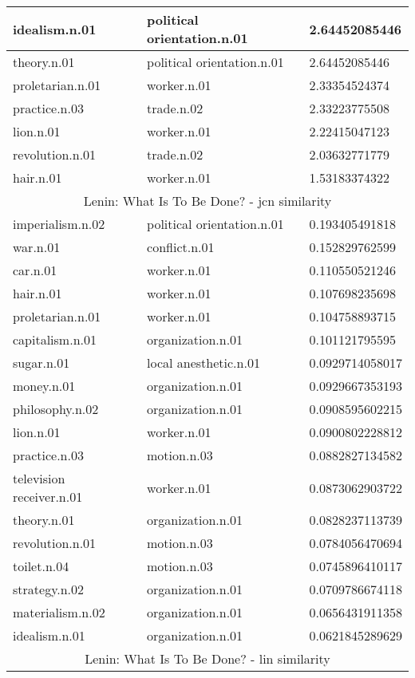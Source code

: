 \begin{center}
\begin{tabular}{ | l | l | l |}
idealism.n.01 & political orientation.n.01 & 2.64452085446 \\ \hline
theory.n.01 & political orientation.n.01 & 2.64452085446 \\ \hline
proletarian.n.01 & worker.n.01 & 2.33354524374 \\ \hline
practice.n.03 & trade.n.02 & 2.33223775508 \\ \hline
lion.n.01 & worker.n.01 & 2.22415047123 \\ \hline
revolution.n.01 & trade.n.02 & 2.03632771779 \\ \hline
hair.n.01 & worker.n.01 & 1.53183374322 \\ \hline
\multicolumn{3}{|c|}{Lenin: What Is To Be Done? - jcn similarity} \\ \hline
imperialism.n.02 & political orientation.n.01 & 0.193405491818 \\ \hline
war.n.01 & conflict.n.01 & 0.152829762599 \\ \hline
car.n.01 & worker.n.01 & 0.110550521246 \\ \hline
hair.n.01 & worker.n.01 & 0.107698235698 \\ \hline
proletarian.n.01 & worker.n.01 & 0.104758893715 \\ \hline
capitalism.n.01 & organization.n.01 & 0.101121795595 \\ \hline
sugar.n.01 & local anesthetic.n.01 & 0.0929714058017 \\ \hline
money.n.01 & organization.n.01 & 0.0929667353193 \\ \hline
philosophy.n.02 & organization.n.01 & 0.0908595602215 \\ \hline
lion.n.01 & worker.n.01 & 0.0900802228812 \\ \hline
practice.n.03 & motion.n.03 & 0.0882827134582 \\ \hline
television receiver.n.01 & worker.n.01 & 0.0873062903722 \\ \hline
theory.n.01 & organization.n.01 & 0.0828237113739 \\ \hline
revolution.n.01 & motion.n.03 & 0.0784056470694 \\ \hline
toilet.n.04 & motion.n.03 & 0.0745896410117 \\ \hline
strategy.n.02 & organization.n.01 & 0.0709786674118 \\ \hline
materialism.n.02 & organization.n.01 & 0.0656431911358 \\ \hline
idealism.n.01 & organization.n.01 & 0.0621845289629 \\ \hline
\multicolumn{3}{|c|}{Lenin: What Is To Be Done? - lin similarity} \\ \hline

\end{tabular}
\end{center}
